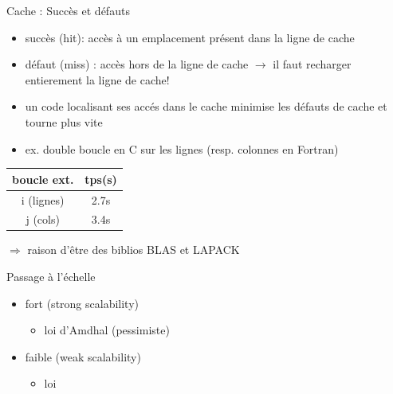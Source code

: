 \documentclass[11pt,mathserif]{beamer}
\begin{document}
\begin{frame}{Cache : Succès et défauts}
\begin{itemize}[<+->]
 \item succès (hit): accès à un emplacement présent dans la ligne de cache 
 \item défaut (miss) : accès hors de la ligne de cache $\rightarrow$ il faut recharger entierement la ligne de cache!
 \item un code localisant ses accés dans le cache minimise les défauts de cache et tourne plus vite
 \item ex. double boucle en C sur les lignes (resp. colonnes en Fortran)
\end{itemize}
\pause
\begin{minipage}[c]{0.49\linewidth}
  
\end{minipage}
\begin{minipage}[c]{0.49\linewidth}
    \begin{tabular}{|c|c|}
    \hline
     boucle ext. & tps(s)  \\
    \hline
      i (lignes) & 2.7s \\
      j (cols)  & 3.4s \\
    \hline
    \end{tabular}
\end{minipage}
\pause 
 $\Rightarrow$ raison d'être des biblios BLAS et LAPACK
\end{frame}
\begin{frame}{Passage à l'échelle}
\begin{itemize}[<+->]
  \item fort (strong scalability)
    \begin{itemize} 
       \item loi d'Amdhal (pessimiste)
    \end{itemize}
  \item faible (weak scalability)
    \begin{itemize}
      \item loi
    \end{itemize}
\end{itemize}
\end{frame}
\end{document}
